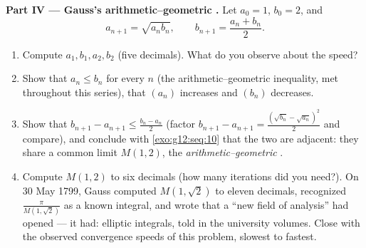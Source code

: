 \begin{problem}
\medskip
\noindent\textbf{Part IV --- Gauss's arithmetic--geometric
.}
Let $a_0 = 1$, $b_0 = 2$, and
\[
a_{n+1} = \sqrt{a_n b_n},
\qquad
b_{n+1} = \frac{a_n + b_n}{2} .
\]
\begin{enumerate}[resume]
  \item Compute $a_1, b_1, a_2, b_2$ (five decimals). What do
        you observe about the speed?
  \item Show that $a_n \leq b_n$ for every $n$ (the
        arithmetic--geometric inequality, met throughout this
        series), that $(a_n)$ increases and $(b_n)$ decreases.
  \item Show that
        $b_{n+1} - a_{n+1} \leq \frac{b_n - a_n}{2}$
        (factor $b_{n+1} - a_{n+1} =
        \frac{(\sqrt{b_n} - \sqrt{a_n})^2}{2}$ and compare),
        and conclude with \cref{exo:g12:seq:10} that the two
         are adjacent: they share a common limit
        $M(1, 2)$, the \emph{arithmetic--geometric }.
  \item Compute $M(1, 2)$ to six decimals (how many iterations
        did you need?). On 30 May 1799, Gauss computed
        $M(1, \sqrt2)$ to eleven decimals, recognized
        $\frac{\pi}{M(1,\sqrt2)}$ as a known integral, and
        wrote that a ``new field of analysis'' had opened ---
        it had: elliptic integrals, told in the university
        volumes. Close with the observed convergence speeds of
        this problem, slowest to fastest.
\end{enumerate}
\end{problem}
